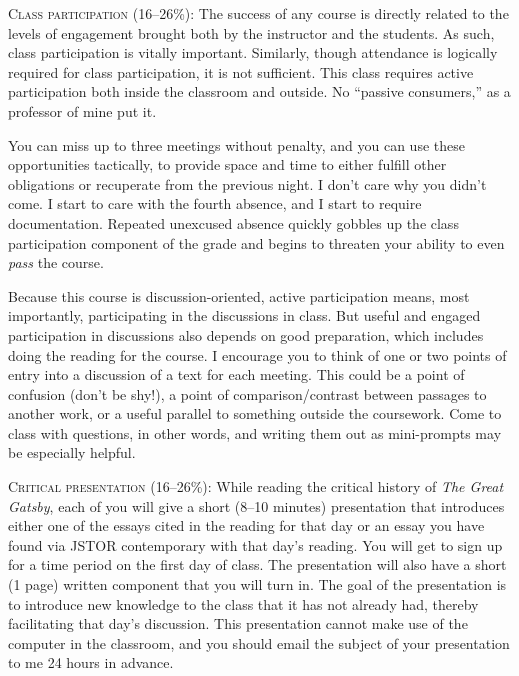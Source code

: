 \begin{description}

  \item \textsc{Class participation (16–26\%):} The success of any course is
    directly related to the levels of engagement brought both by the instructor
    and the students. As such, class participation is vitally important.
    Similarly, though attendance is logically required for class participation,
    it is not sufficient. This class requires active participation both inside
    the classroom and outside. No “passive consumers,” as a professor of mine
    put it. 
    
    You can miss up to three meetings without penalty, and you can use these
    opportunities tactically, to provide space and time to either fulfill
    other obligations or recuperate from the previous night. I don’t care why
    you didn’t come. I start to care with the fourth absence, and I start to
    require documentation. Repeated unexcused absence quickly gobbles up the
    class participation component of the grade and begins to threaten your
    ability to even \textit{pass} the course.

    Because this course is discussion-oriented, active participation means,
    most importantly, participating in the discussions in class. But useful and
    engaged participation in discussions also depends on good preparation,
    which includes doing the reading for the course. I encourage you to think
    of one or two points of entry into a discussion of a text for each meeting.
    This could be a point of confusion (don’t be shy!), a point of
    comparison/contrast between passages to another work, or a useful parallel
    to something outside the coursework. Come to class with questions, in other
    words, and writing them out as mini-prompts may be especially helpful.

  \item \textsc{Critical presentation (16–26\%):} While reading the critical
    history of \textit{The Great Gatsby}, each of you will give a short (8–10
    minutes) presentation that introduces either one of the essays cited in the
    reading for that day or an essay you have found via JSTOR contemporary with
    that day’s reading. You will get to sign up for a time period on the first
    day of class. The presentation will also have a short (1 page) written
    component that you will turn in. The goal of the presentation is to
    introduce new knowledge to the class that it has not already had, thereby
    facilitating that day’s discussion. This presentation cannot make use of
    the computer in the classroom, and you should email the subject of your
    presentation to me 24 hours in advance.


\end{description}
